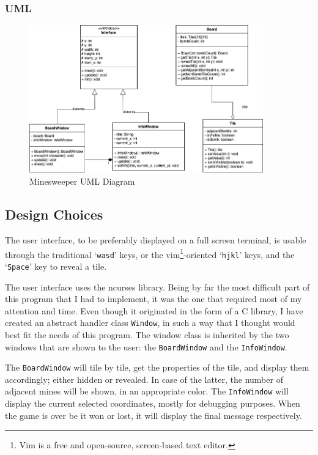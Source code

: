 \documentclass{article}
\newcommand{\code}[1]{\texttt{#1}}
\begin{document}
\subsubsection{UML}

\vspace{6em}
\begin{figure}[h]
	\centering
	\includegraphics[width=0.9\textwidth]{images/minesweeper.png}
	\caption{Minesweeper UML Diagram}
\end{figure}

\newpage

\subsection{Design Choices}

The user interface, to be preferably displayed on a full screen terminal, is
usable through the traditional `\code{wasd}' keys, or the vim\footnote{Vim is a free and open-source, screen-based text editor.}-oriented `\code{hjkl}' keys, and the `\code{Space}'
key to reveal a tile.

The user interface uses the ncurses library. Being by far the most
difficult part of this program that I had to implement, it was the one that required most of 
my attention and time. Even though it originated in the form of a C library, I have created
an abstract handler class \code{Window}, in such a way that I thought would best fit the
needs of this program. The window class is inherited by the two windows that are shown
to the user: the \code{BoardWindow} and the \code{InfoWindow}.

The \code{BoardWindow} will tile by tile, get the properties of the tile, and
display them accordingly; either hidden or revealed. In case of the latter, the number 
of adjacent mines will be shown, in an appropriate color. The \code{InfoWindow} will display the current selected coordinates, mostly for debugging
purposes. When the game is over be it won or lost, it will display the final message respectively.
\end{document}
